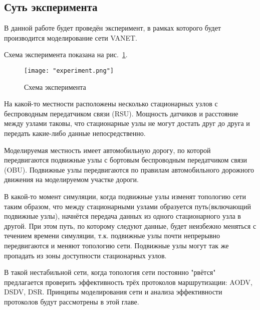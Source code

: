 \subsection*{Суть эксперимента}

В данной работе будет проведён эксперимент, в рамках которого будет производится моделирование сети VANET. 

Схема эксперимента показана на рис.~\ref{fig:experiment_scheme}.

\begin{figure}[!h]
    \centering
    \texttt{[image: "experiment.png"]}
    \caption{Схема эксперимента}
    \label{fig:experiment_scheme}
\end{figure}

На какой-то местности расположены несколько стационарных узлов с беспроводным передатчиком связи (RSU). Мощность датчиков и расстояние между узлами таковы, что стационарные узлы не могут достать друг до друга и передать какие-либо данные непосредственно. 

Моделируемая местность имеет автомобильную дорогу, по которой передвигаются подвижные узлы с бортовым беспроводным передатчиком связи (OBU). Подвижные узлы передвигаются по правилам автомобильного дорожного движения на моделируемом участке дороги.

В какой-то момент симуляции, когда подвижные узлы изменят топологию сети таким образом, что между стационарными узлами образуется путь(включающий подвижные узлы), начнётся передача данных из одного стационарного узла в другой. При этом путь, по которому следуют данные, будет неизбежно меняться с течением времени симуляции, т.к. подвижные узлы почти непрерывно передвигаются и меняют топологию сети. Подвижные узлы могут так же пропадать из зоны доступности стационарных узлов.

В такой нестабильной сети, когда топология сети постоянно "рвётся"\, предлагается проверить эффективность трёх протоколов маршрутизации: AODV, DSDV, DSR. Принципы моделирования сети и анализа эффективности протоколов будут рассмотрены в этой главе.